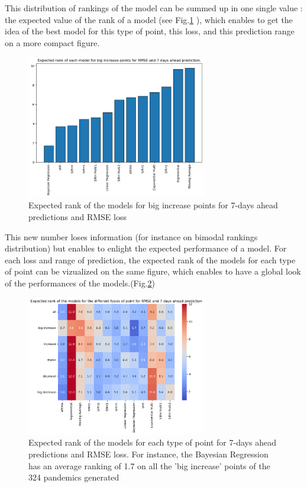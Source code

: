 This distribution of rankings of the model can be summed up in one single value : the expected value of the rank of a model (see Fig.\ref{fig:expected_rank} ), which enables to get the idea of the best model for this type of point, this loss, and this prediction range on a more compact figure. 

\begin{figure}[h]
    \centering
    \includegraphics[width=0.7\textwidth]{figures/expected_ranks_big_increase_RMSE_7.png}
    \caption{Expected rank of the models for big increase points for 7-days ahead predictions and RMSE loss}
    \label{fig:expected_rank}
\end{figure}
This new number loses information (for instance on bimodal rankings distribution) but enables to enlight the expected performance of a model. 
For each loss and range of prediction, the expected rank of the models for each type of point can be vizualized on the same figure, which enables to have a global look of the performances of the models.(Fig.\ref{fig:heatmap_RMSE_7}) 
\begin{figure}[h]
    \centering
    \includegraphics[width=0.7\textwidth]{figures/heatmap_RMSE_7.png}
    \caption{Expected rank of the models for each type of point for 7-days ahead predictions and RMSE loss. For instance, the Bayesian Regression has an average ranking of 1.7 on all the 'big increase' points of the 324 pandemics generated }
    \label{fig:heatmap_RMSE_7}
\end{figure}


